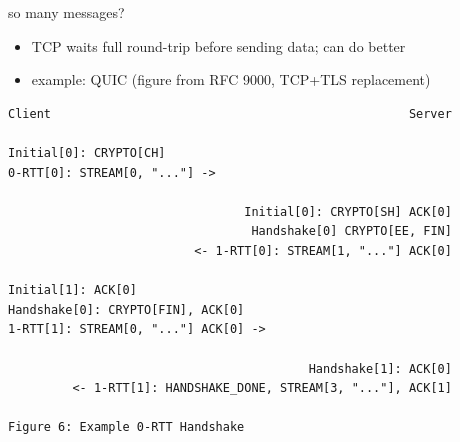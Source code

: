 \begin{frame}[fragile]{so many messages?}
    \begin{itemize}
    \item TCP waits full round-trip before sending data; can do better
    \item example: QUIC (figure from RFC 9000, TCP+TLS replacement)
    \end{itemize}
\begin{Verbatim}[fontsize=\fontsize{8}{9}\selectfont]
Client                                                  Server

Initial[0]: CRYPTO[CH]
0-RTT[0]: STREAM[0, "..."] ->

                                 Initial[0]: CRYPTO[SH] ACK[0]
                                  Handshake[0] CRYPTO[EE, FIN]
                          <- 1-RTT[0]: STREAM[1, "..."] ACK[0]

Initial[1]: ACK[0]
Handshake[0]: CRYPTO[FIN], ACK[0]
1-RTT[1]: STREAM[0, "..."] ACK[0] ->

                                          Handshake[1]: ACK[0]
         <- 1-RTT[1]: HANDSHAKE_DONE, STREAM[3, "..."], ACK[1]

Figure 6: Example 0-RTT Handshake
\end{Verbatim}
\end{frame}
